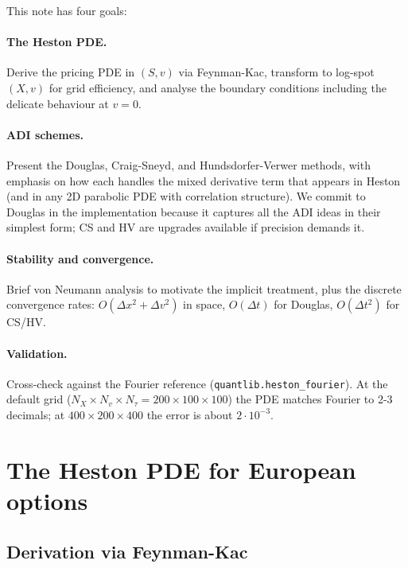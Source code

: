 \documentclass[11pt]{article}
\theoremstyle{plain}
\theoremstyle{definition}
\theoremstyle{remark}
\begin{document}
This note has four goals:

\paragraph{The Heston PDE.} Derive the pricing PDE in $(S, v)$ via Feynman-Kac, transform to log-spot $(X, v)$ for grid efficiency, and analyse the boundary conditions including the delicate behaviour at $v = 0$.

\paragraph{ADI schemes.} Present the Douglas, Craig-Sneyd, and Hundsdorfer-Verwer methods, with emphasis on how each handles the mixed derivative term that appears in Heston (and in any 2D parabolic PDE with correlation structure). We commit to Douglas in the implementation because it captures all the ADI ideas in their simplest form; CS and HV are upgrades available if precision demands it.

\paragraph{Stability and convergence.} Brief von Neumann analysis to motivate the implicit treatment, plus the discrete convergence rates: $O(\Delta x^2 + \Delta v^2)$ in space, $O(\Delta t)$ for Douglas, $O(\Delta t^2)$ for CS/HV.

\paragraph{Validation.} Cross-check against the Fourier reference (\texttt{quantlib.heston\_fourier}). At the default grid ($N_X \times N_v \times N_\tau = 200 \times 100 \times 100$) the PDE matches Fourier to 2-3 decimals; at $400 \times 200 \times 400$ the error is about $2 \cdot 10^{-3}$.

\section{The Heston PDE for European options}

\subsection{Derivation via Feynman-Kac}
\end{document}
